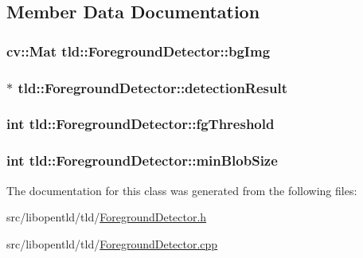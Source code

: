 \subsection{Member Data Documentation}
\hypertarget{classtld_1_1_foreground_detector_a03accab9e786b8dcb6c332424ed5dee0}{
\subsubsection[{bgImg}]{\setlength{\rightskip}{0pt plus 5cm}cv::Mat {\bf tld::ForegroundDetector::bgImg}}}
\label{classtld_1_1_foreground_detector_a03accab9e786b8dcb6c332424ed5dee0}
\hypertarget{classtld_1_1_foreground_detector_a01d0c37f4019847febbea0f9a121b49b}{
\subsubsection[{detectionResult}]{$\ast$ {\bf tld::ForegroundDetector::detectionResult}}}
\label{classtld_1_1_foreground_detector_a01d0c37f4019847febbea0f9a121b49b}
\hypertarget{classtld_1_1_foreground_detector_a317e60e1eb84270f60e818c0cb896416}{
\subsubsection[{fgThreshold}]{\setlength{\rightskip}{0pt plus 5cm}int {\bf tld::ForegroundDetector::fgThreshold}}}
\label{classtld_1_1_foreground_detector_a317e60e1eb84270f60e818c0cb896416}
\hypertarget{classtld_1_1_foreground_detector_ac274f17680c4551c9b3198e88b5bcd42}{
\subsubsection[{minBlobSize}]{\setlength{\rightskip}{0pt plus 5cm}int {\bf tld::ForegroundDetector::minBlobSize}}}
\label{classtld_1_1_foreground_detector_ac274f17680c4551c9b3198e88b5bcd42}


The documentation for this class was generated from the following files:\begin{DoxyCompactItemize}
\item 
src/libopentld/tld/\hyperlink{_foreground_detector_8h}{ForegroundDetector.h}\item 
src/libopentld/tld/\hyperlink{_foreground_detector_8cpp}{ForegroundDetector.cpp}\end{DoxyCompactItemize}
